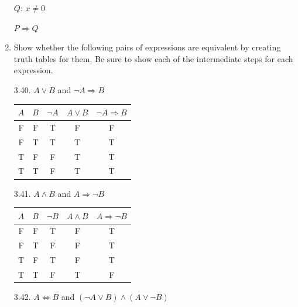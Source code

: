 \documentclass[10pt]{article}
\begin{document}
\begin{enumerate}[label={}]
            $Q$: $x \neq 0$

            $P \Rightarrow Q$

      \item Show whether the following pairs of expressions are equivalent by creating truth
            tables for them. Be sure to show each of the intermediate steps for each expression.


            3.40. $A \vee B$ and $\neg A \Rightarrow B$

            \begin{tabular}{ |c|c|c|c|c|  }
                  \hline
                  $A$ & $B$ & $\neg A$ & $A \vee B$ & $\neg A \Rightarrow B$ \\
                  \hline
                  F   & F   & T        & F          & F                      \\
                  F   & T   & T        & T          & T                      \\
                  T   & F   & F        & T          & T                      \\
                  T   & T   & F        & T          & T                      \\
                  \hline
            \end{tabular}


            3.41. $A \wedge B$ and $A \Rightarrow \neg B$

            \begin{tabular}{ |c|c|c|c|c|  }
                  \hline
                  $A$ & $B$ & $\neg B$ & $A \wedge B$ & $A \Rightarrow \neg B$ \\
                  \hline
                  F   & F   & T        & F            & T                      \\
                  F   & T   & F        & F            & T                      \\
                  T   & F   & T        & F            & T                      \\
                  T   & T   & F        & T            & F                      \\
                  \hline
            \end{tabular}


            3.42. $A \Leftrightarrow B$ and $(\neg A \vee B) \wedge(A \vee \neg B)$



\end{enumerate}
\end{document}
